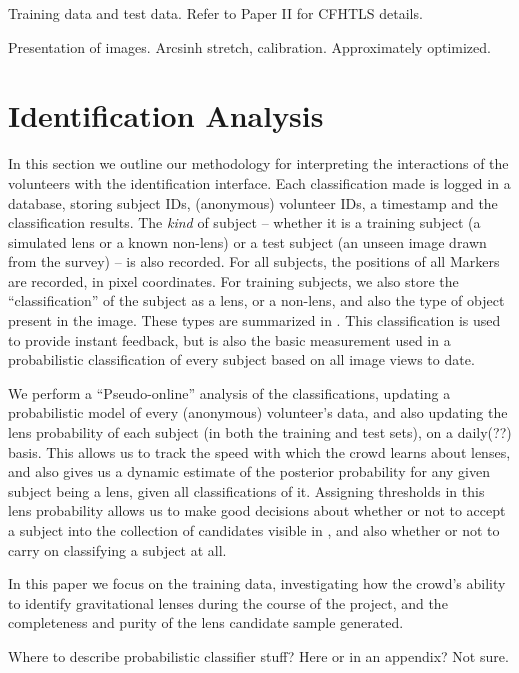 \documentclass[useAMS,usenatbib,a4paper]{mn2e}
\begin{document}
Training data and test data. Refer to Paper II for CFHTLS details.

Presentation of images. Arcsinh stretch, calibration. Approximately
optimized.



\section{Identification Analysis}
\label{sec:IDanalysis}

In this section we outline our methodology for interpreting the
interactions of the volunteers with the identification interface.  Each
classification made is logged in a database, storing subject IDs,
(anonymous) volunteer IDs, a timestamp and the classification results. 
The {\it kind} of subject -- whether it is a training subject (a 
simulated lens or a known non-lens) or a test subject (an unseen image
drawn from the survey) -- is also recorded. For all subjects, the
positions of all Markers are recorded, in pixel coordinates. For
training subjects, we also store the ``classification'' of the subject
as a lens, or a non-lens, and also the type of object present in the
image. These types are summarized in . 
This classification is used to provide instant feedback, but is also the
basic measurement used in a probabilistic classification of every
subject based on all image views to date.

We perform a ``Pseudo-online'' analysis of the classifications, 
updating a probabilistic model of every (anonymous) volunteer's
data, and also updating the lens probability of each subject 
(in both the training and test sets), on a
daily(??) basis. This allows us to track the speed with which the crowd
learns about lenses, and also gives us a dynamic estimate of the
posterior probability for  any given  subject being a lens, given all
classifications of it. Assigning thresholds in this lens probability
allows us to make good decisions about whether or not to accept a
subject into the collection of candidates visible in \Talk, and also
whether or not to  carry on classifying a subject at all. 

In this paper we focus on the training data,  investigating  how the 
crowd's ability to identify gravitational lenses during the course of
the project, and the completeness and purity of the lens candidate
sample generated.

Where to describe probabilistic classifier stuff? Here or in an
appendix? Not sure.
\end{document}
